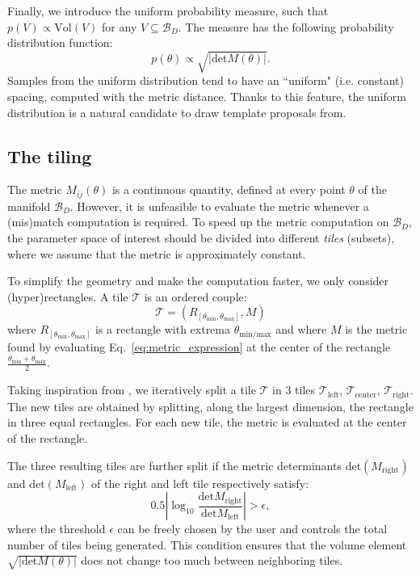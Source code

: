 \documentclass[twocolumn,showpacs,preprintnumbers,nofootinbib,prd,
superscriptaddress,10pt]{revtex4-2}
\begin{document}
Finally, we introduce the uniform probability measure, such that $p(V) \propto \text{Vol}(V)$ for any $V\subseteq \mathcal{B}_D$. The measure has the following probability distribution function:
\begin{equation}\label{eq:pdf_uniform}
	p(\theta) \propto \sqrt{|\text{det}M(\theta)|}.
\end{equation}
Samples from the uniform distribution tend to have an ``uniform" (i.e. constant) spacing, computed with the metric distance. Thanks to this feature, the uniform distribution is a natural candidate to draw template proposals from.

\subsection{The tiling} \label{sec:tiling}

The metric $M_{ij}(\theta)$ is a continuous quantity, defined at every point $\theta$ of the manifold $\mathcal{B}_D$.
However, it is unfeasible to evaluate the metric whenever a (mis)match computation is required.
To speed up the metric computation on $\mathcal{B}_D$, the parameter space of interest should be divided into different {\it tiles} (subsets), where we assume that the metric is approximately constant.

To simplify the geometry and make the computation faster, we only consider (hyper)rectangles. A tile $\mathcal{T}$ is an ordered couple:
\begin{equation} \label{eq:tile}
	\mathcal{T} = \left(R_{[\theta_\text{min}, \theta_\text{max}]}, M \right)
\end{equation}
where $R_{[\theta_\text{min}, \theta_\text{max}]}$ is a rectangle with extrema $\theta_{\text{min/max}}$ and where $M$ is the metric found by evaluating Eq.~\eqref{eq:metric_expression} at the center of the rectangle $\frac{\theta_\text{min}+\theta_\text{max}}{2}$.

Taking inspiration from \cite{Hanna:2022zpk}, we iteratively split a tile $\mathcal{T}$ in 3 tiles $\mathcal{T}_\text{left}$, $\mathcal{T}_\text{center}$, $\mathcal{T}_\text{right}$. The new tiles are obtained by splitting, along the largest dimension, the rectangle in three equal rectangles. For each new tile, the metric is evaluated at the center of the rectangle.

The three resulting tiles are further split if the metric determinants $\text{det}\left(M_\text{right}\right)$ and $\text{det}\left(M_\text{left}\right)$ of the right and left tile respectively satisfy:
\begin{equation}\label{eq:stop_tiling}
	0.5\left|\log_{\textrm{10}}\frac{\text{det} M_\text{right}}{\text{det}M_\text{left}}\right| > \epsilon,
\end{equation}
where the threshold $\epsilon$ can be freely chosen by the user and controls the total number of tiles being generated.
This condition ensures that the volume element $\sqrt{|\text{det}M(\theta)|}$ does not change too much between neighboring tiles.
\end{document}
